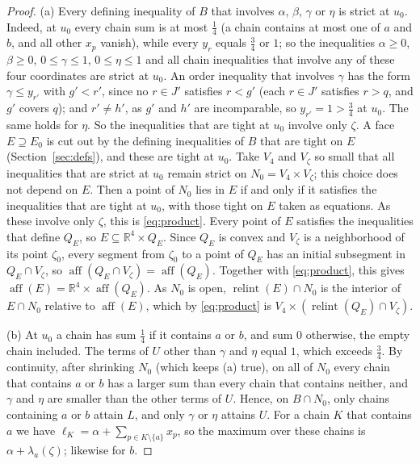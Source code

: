 \documentclass[11pt]{article}
\theoremstyle{definition}
\theoremstyle{remark}
\newcommand{\relint}{\operatorname{relint}}
\newcommand{\aff}{\operatorname{aff}}
\begin{document}
\begin{proof}
(a) Every defining inequality of $B$ that involves $\alpha$, $\beta$, $\gamma$ or $\eta$ is strict at $u_0$. Indeed, at $u_0$ every chain sum is at most $\frac14$ (a chain
contains at most one of $a$ and $b$, and all other $x_p$ vanish), while every $y_r$ equals $\frac34$ or $1$; so the inequalities $\alpha\geq0$, $\beta\geq0$, $0\leq\gamma\leq1$, $0\leq\eta\leq1$ and all chain inequalities that involve any of these four coordinates are strict at $u_0$. An order inequality that involves $\gamma$ has the form $\gamma\leq y_{r'}$ with
$g'<r'$, since no $r\in J'$ satisfies $r<g'$ (each $r\in J'$ satisfies $r>q$, and $g'$ covers $q$); and $r'\neq h'$, as $g'$ and $h'$
are incomparable, so $y_{r'}=1>\frac34$ at $u_0$. The same holds for $\eta$. So the inequalities
that are tight at $u_0$ involve only $\zeta$. A face $E\supseteq E_0$ is cut out by the defining inequalities of $B$ that are tight on $E$ (Section~\ref{sec:defs}), and these are tight at $u_0$.
Take $V_4$ and $V_\zeta$ so small that all inequalities that are strict at $u_0$ remain strict on $N_0=V_4\times V_\zeta$; this choice does not depend on $E$. Then a point of $N_0$ lies in $E$ if and only if it
satisfies the inequalities that are tight at $u_0$, with those tight on $E$ taken as equations. As these
involve only $\zeta$, this is \eqref{eq:product}. Every point of $E$ satisfies the inequalities that
define $Q_E$, so $E\subseteq\mathbb R^4\times Q_E$. Since $Q_E$ is convex and $V_\zeta$ is a neighborhood of its point $\zeta_0$, every segment from $\zeta_0$ to a point of $Q_E$ has an initial subsegment in $Q_E\cap V_\zeta$, so $\aff(Q_E\cap V_\zeta)=\aff(Q_E)$. Together with \eqref{eq:product}, this gives $\aff(E)=\mathbb R^4\times\aff(Q_E)$. As $N_0$ is open, $\relint(E)\cap N_0$ is the interior of $E\cap N_0$
relative to $\aff(E)$, which by \eqref{eq:product} is $V_4\times(\relint(Q_E)\cap V_\zeta)$.

(b) At $u_0$ a chain has sum $\frac14$ if it contains $a$ or $b$, and sum $0$ otherwise, the empty chain included. The terms of $U$ other than $\gamma$
and $\eta$ equal $1$, which exceeds $\frac34$. By continuity, after shrinking $N_0$ (which keeps (a) true), on all of $N_0$ every chain that contains $a$ or $b$ has a larger sum than every chain that contains neither, and $\gamma$ and $\eta$ are smaller than the other terms of $U$. Hence, on $B\cap N_0$, only chains containing $a$ or $b$ attain $L$, and only $\gamma$ or $\eta$ attains $U$. For a chain $K$ that contains $a$ we have
$\ell_K=\alpha+\sum_{p\in K\setminus\{a\}}x_p$, so the maximum over these chains is $\alpha+\lambda_a(\zeta)$;
likewise for $b$.
\end{proof}
\end{document}
